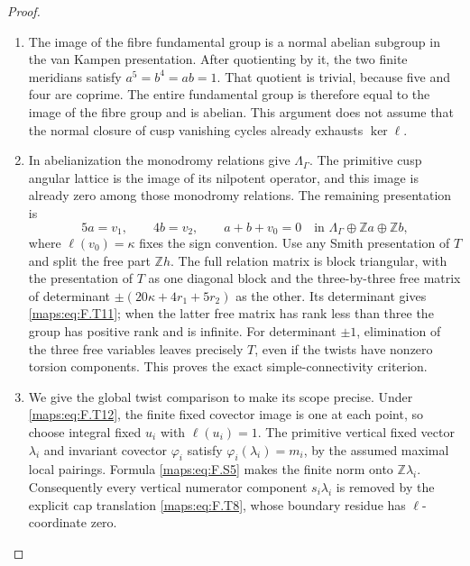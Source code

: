 \documentclass[11pt,a4paper]{article}
\theoremstyle{definition}
\begin{document}
\begin{proof}
\begin{enumerate}[label=\arabic*.]
\item The image of the fibre fundamental group is a normal
abelian subgroup in the van Kampen presentation.
After quotienting by it, the two finite meridians satisfy
$a^5=b^4=ab=1$.
That quotient is trivial, because five and four are coprime.
The entire fundamental group is therefore equal to the
image of the fibre group and is abelian.
This argument does not assume that the normal closure of
cusp vanishing cycles already exhausts $\ker\ell$.

\item In abelianization the monodromy relations give
$\Lambda_\Gamma$.
The primitive cusp angular lattice is the image of its
nilpotent operator, and this image is already zero among
those monodromy relations.
The remaining presentation is
\[
 5a=v_1,\qquad4b=v_2,\qquad a+b+v_0=0
 \quad\text{in }\Lambda_\Gamma\oplus\mathbb Za\oplus\mathbb Zb,
 \tag{F.T13}\label{maps:eq:F.T13}
\]
where $\ell(v_0)=\kappa$ fixes the sign convention.
Use any Smith presentation of $T$ and split the free part
$\mathbb Zh$.
The full relation matrix is block triangular, with the
presentation of $T$ as one diagonal block and the
three-by-three free matrix of determinant
$\pm(20\kappa+4r_1+5r_2)$ as the other.
Its determinant gives \eqref{maps:eq:F.T11}; when the latter free
matrix has rank less than three the group has positive
rank and is infinite.
For determinant $\pm1$, elimination of the three free
variables leaves precisely $T$, even if the twists have
nonzero torsion components.
This proves the exact simple-connectivity criterion.

\item We give the global twist comparison to make its scope
precise.  Under \eqref{maps:eq:F.T12}, the finite fixed covector image
is one at each point, so choose integral fixed $u_i$ with
$\ell(u_i)=1$.  The primitive vertical fixed vector
$\lambda_i$ and invariant covector $\varphi_i$ satisfy
$\varphi_i(\lambda_i)=m_i$, by the assumed maximal local
pairings.  Formula \eqref{maps:eq:F.S5} makes the finite norm onto
$\mathbb Z\lambda_i$.
Consequently every vertical numerator component
$s_i\lambda_i$ is removed by the explicit cap translation
\eqref{maps:eq:F.T8}, whose boundary residue has $\ell$-coordinate zero.


\end{enumerate}
\end{proof}
\end{document}
